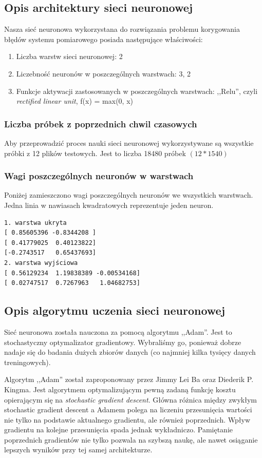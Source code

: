 \documentclass{classrep}
\begin{document}
\subsection{Opis architektury sieci neuronowej}
Nasza sieć neuronowa wykorzystana do rozwiązania problemu korygowania błędów systemu pomiarowego posiada następujące właściwości:
\begin{enumerate}
	\item Liczba warstw sieci neuronowej: 2
	\item Liczebność neuronów w poszczególnych warstwach: 3, 2
	\item Funkcje aktywacji zastosowanych w poszczególnych warstwach: ,,Relu'', czyli  \textsl{rectified linear unit}, f(x) = max(0, x)
\end{enumerate}

\subsubsection{Liczba próbek z poprzednich chwil czasowych} 
Aby przeprowadzić proces nauki sieci neuronowej wykorzystywane są wszystkie próbki z 12 plików testowych. Jest to liczba 18480 próbek $(12 * 1540)$

\subsubsection{Wagi poszczególnych neuronów w warstwach} 
Poniżej zamieszczono wagi poszczególnych neuronów we wszystkich warstwach. Jedna linia w nawiasach kwadratowych reprezentuje jeden neuron.
\begin{verbatim}
1. warstwa ukryta
[ 0.85605396 -0.8344208 ]
[ 0.41779025  0.40123822]
[-0.2743517   0.65437693]
2. warstwa wyjściowa
[ 0.56129234  1.19838389 -0.00534168]
[ 0.02747517  0.7267963   1.04682753]
\end{verbatim}
\subsection{Opis algorytmu uczenia sieci neuronowej}
Sieć neuronowa została nauczona za pomocą algorytmu ,,Adam''. Jest to stochastyczny optymalizator gradientowy. Wybraliśmy go, ponieważ dobrze nadaje się do badania dużych zbiorów danych (co najmniej kilka tysięcy danych treningowych). \cite{doc} 

Algorytm ,,Adam'' został zaproponowany przez Jimmy Lei Ba oraz Diederik P. Kingma. Jest algorytmem optymalizującym pewną zadaną funkcję kosztu opierającym się na \textsl{stochastic gradient descent}. Główna różnica między zwykłym stochastic gradient descent a Adamem polega na liczeniu przesunięcia wartości nie tylko na podstawie aktualnego gradientu, ale również poprzednich.
Wpływ gradientu na kolejne przesunięcia spada jednak wykładniczo. Pamiętanie poprzednich gradientów nie tylko pozwala na szybszą naukę, ale nawet osiąganie lepszych wyników przy tej samej architekturze. \cite{adampl} 
\end{document}
